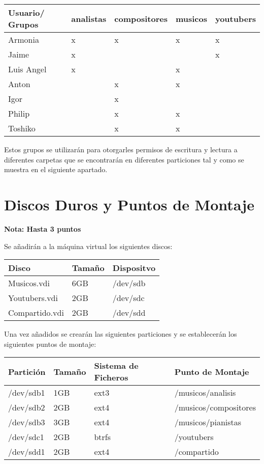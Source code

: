 \documentclass[11pt]{article}
\begin{document}
\begin{center}
\begin{tabular}{lllll}
Usuario/ Grupos & analistas & compositores & musicos & youtubers\\
\hline
Armonia & x & x & x & x\\
Jaime & x &  &  & x\\
Luis Angel & x &  & x & \\
Anton &  & x & x & \\
Igor &  & x &  & \\
Philip &  & x & x & \\
Toshiko &  & x & x & \\
\hline
\end{tabular}
\end{center}

Estos grupos se utilizarán para otorgarles permisos de escritura y lectura a
diferentes carpetas que se encontrarán en diferentes particiones tal y como se
muestra en el siguiente apartado.

\section{Discos Duros y Puntos de Montaje}
\label{sec-5}

\textbf{Nota: Hasta 3 puntos}

Se añadirán a la máquina virtual los siguientes discos:

\begin{center}
\begin{tabular}{lll}
Disco & Tamaño & Dispositvo\\
\hline
Musicos.vdi & 6GB & /dev/sdb\\
Youtubers.vdi & 2GB & /dev/sdc\\
Compartido.vdi & 2GB & /dev/sdd\\
\end{tabular}
\end{center}

Una vez añadidos se crearán las siguientes particiones y se establecerán los
siguientes puntos de montaje:

\begin{center}
\begin{tabular}{llll}
Partición & Tamaño & Sistema de Ficheros & Punto de Montaje\\
\hline
/dev/sdb1 & 1GB & ext3 & /musicos/analisis\\
/dev/sdb2 & 2GB & ext4 & /musicos/compositores\\
/dev/sdb3 & 3GB & ext4 & /musicos/pianistas\\
/dev/sdc1 & 2GB & btrfs & /youtubers\\
/dev/sdd1 & 2GB & ext4 & /compartido\\
\end{tabular}
\end{center}
\end{document}
